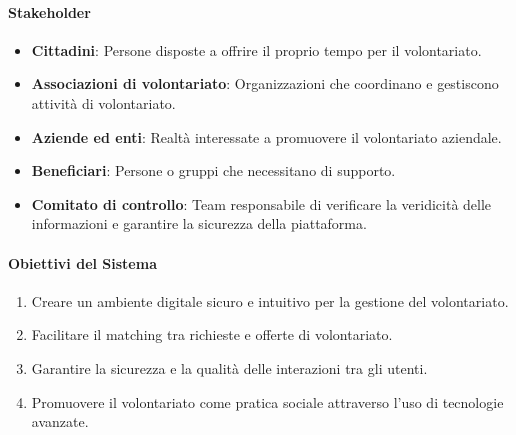 \paragraph{Stakeholder}
\begin{itemize}
\item \textbf{Cittadini}: Persone disposte a offrire il proprio tempo per il volontariato.
\item \textbf{Associazioni di volontariato}: Organizzazioni che coordinano e gestiscono attività di volontariato.
\item \textbf{Aziende ed enti}: Realtà interessate a promuovere il volontariato aziendale.
\item \textbf{Beneficiari}: Persone o gruppi che necessitano di supporto.
\item \textbf{Comitato di controllo}: Team responsabile di verificare la veridicità delle informazioni e garantire la sicurezza della piattaforma.
\end{itemize}

\paragraph{Obiettivi del Sistema}
\begin{enumerate}
\item Creare un ambiente digitale sicuro e intuitivo per la gestione del volontariato.
\item Facilitare il matching tra richieste e offerte di volontariato.
\item Garantire la sicurezza e la qualità delle interazioni tra gli utenti.
\item Promuovere il volontariato come pratica sociale attraverso l'uso di tecnologie avanzate.
\end{enumerate}

